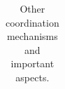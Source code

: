 \begin{center}
\begin{longtable}{| p{6cm} | p{9cm} |}

    \caption{Other coordination mechanisms and important aspects.}
    \label{ocmaia}
    \end{longtable}
\end{center}